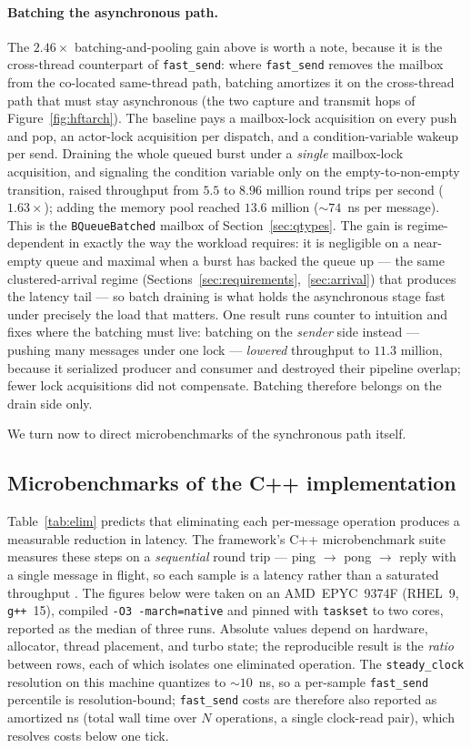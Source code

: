 \documentclass[11pt]{article}
\newcommand{\fs}{\texttt{fast\_send}}
\begin{document}
\paragraph{Batching the asynchronous path.} The $2.46\times$ batching-and-pooling
gain above is worth
a note, because it is the cross-thread counterpart of \fs{}: where \fs{} removes
the mailbox from the co-located same-thread path, batching amortizes it on the
cross-thread path that must stay asynchronous (the two capture and transmit hops
of Figure~\ref{fig:hftarch}). The baseline pays a mailbox-lock acquisition on
every push and pop, an actor-lock acquisition per dispatch, and a
condition-variable wakeup per send. Draining the whole queued burst under a
\emph{single} mailbox-lock acquisition, and signaling the condition variable only
on the empty-to-non-empty transition, raised throughput from $5.5$ to $8.96$
million round trips per second ($1.63\times$); adding the memory pool reached
$13.6$ million ($\sim\!74$~ns per message). This is the \texttt{BQueueBatched}
mailbox of Section~\ref{sec:qtypes}. The gain is regime-dependent in exactly the
way the workload requires: it is negligible on a near-empty queue and maximal
when a burst has backed the queue up --- the same clustered-arrival regime
(Sections~\ref{sec:requirements},~\ref{sec:arrival}) that produces the latency
tail --- so batch draining is what holds the asynchronous stage fast under
precisely the load that matters. One result runs counter to intuition and fixes
where the batching must live: batching on the \emph{sender} side instead ---
pushing many messages under one lock --- \emph{lowered} throughput to $11.3$
million, because it serialized producer and consumer and destroyed their pipeline
overlap; fewer lock acquisitions did not compensate. Batching therefore belongs
on the drain side only.

We turn now to direct microbenchmarks of the synchronous path itself.

\subsection{Microbenchmarks of the C++ implementation}
\label{sec:micro}

Table~\ref{tab:elim} predicts that eliminating each per-message operation
produces a measurable reduction in latency. The framework's C++ microbenchmark
suite measures these steps on a \emph{sequential} round trip --- ping $\to$ pong
$\to$ reply with a single message in flight, so each sample is a latency rather
than a saturated throughput \cite{kasparperf}. The figures below were taken on an
AMD~EPYC~9374F (RHEL~9, \texttt{g++}~15), compiled \texttt{-O3 -march=native}
and pinned with \texttt{taskset} to two cores, reported as the median of three
runs. Absolute values depend on hardware, allocator, thread placement, and turbo
state; the reproducible result is the \emph{ratio} between rows, each of which
isolates one eliminated operation. The \texttt{steady\_clock} resolution on this
machine quantizes to $\sim\!10$~ns, so a per-sample \fs{} percentile is
resolution-bound; \fs{} costs are therefore also reported as amortized ns (total
wall time over $N$ operations, a single clock-read pair), which resolves costs
below one tick.
\end{document}
